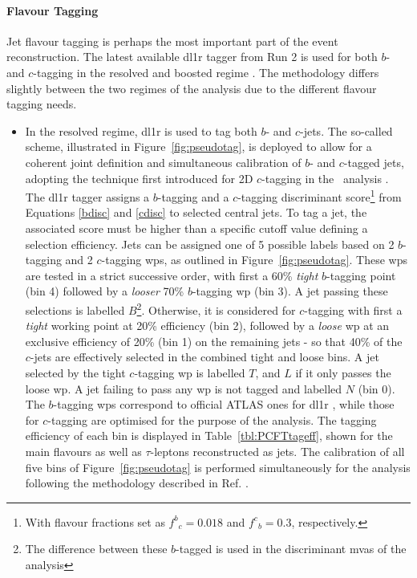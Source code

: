 \paragraph{Flavour Tagging} Jet flavour tagging is perhaps the most important part of the event reconstruction. The latest available \gls{dl1r} tagger from Run 2 is used for both $b$- and $c$-tagging in the resolved and boosted regime \cite{atlas:FTAGRUN2}. The methodology differs slightly between the two regimes of the analysis due to the different flavour tagging needs.
\begin{itemize}[leftmargin=*]
\item In the resolved regime, \gls{dl1r} is used to tag both $b$- and $c$-jets. The so-called  scheme, illustrated in Figure~\ref{fig:pseudotag}, is deployed to allow for a coherent joint definition and simultaneous calibration of $b$- and $c$-tagged jets, adopting the technique first introduced for 2D $c$-tagging in the \vhc\ analysis \cite{Collaboration:2721696}. The \gls{dl1r} tagger assigns a $b$-tagging and a $c$-tagging discriminant score\footnote{With flavour fractions set as ${f^b}_c = 0.018$ and ${f^c}_b = 0.3$, respectively.} from Equations \ref{bdisc} and \ref{cdisc} to selected central jets. To tag a jet, the associated score must be higher than a specific cutoff value defining a  selection efficiency. Jets can be assigned one of 5 possible labels based on 2 $b$-tagging and 2 $c$-tagging \glspl{wp}, as outlined in Figure~\ref{fig:pseudotag}. These \glspl{wp} are tested in a strict successive order, with first a 60\% \textit{tight} $b$-tagging point (bin 4) followed by a \textit{looser} 70\% $b$-tagging \gls{wp} (bin 3). A jet passing these selections is labelled $B$\footnote{The difference between these $b$-tagged is used in the discriminant \glspl{mva} of the analysis}. Otherwise, it is considered for $c$-tagging with first a \textit{tight} working point at 20\% efficiency (bin 2), followed by a \textit{loose} \gls{wp} at an exclusive efficiency of 20\% (bin 1) on the remaining jets - so that 40\% of the $c$-jets are effectively selected in the combined tight and loose bins. A jet selected by the tight $c$-tagging \gls{wp} is labelled $T$, and $L$ if it only passes the loose \gls{wp}. A jet failing to pass any \gls{wp} is not tagged and labelled $N$ (bin 0). The $b$-tagging \glspl{wp} correspond to official ATLAS ones for \gls{dl1r} \cite{atlas:FTAGRUN2}, while those for $c$-tagging are optimised for the purpose of the analysis. The tagging efficiency of each bin is displayed in Table~\ref{tbl:PCFTtageff}, shown for the main flavours as well as $\tau$-leptons reconstructed as jets. The calibration of all five bins of Figure~\ref{fig:pseudotag} is performed simultaneously for the analysis following the methodology described in Ref. \cite{atlas:FTAGRUN2}.%

\end{itemize}
